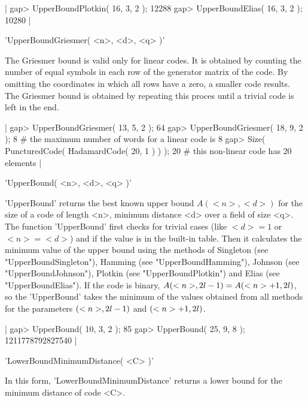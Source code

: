 |    gap> UpperBoundPlotkin( 16, 3, 2 );
    12288
    gap> UpperBoundElias( 16, 3, 2 );
    10280 |


'UpperBoundGriesmer( <n>, <d>, <q> )'

The Griesmer  bound is valid only   for linear codes.  It is  obtained by
counting the number of equal symbols in  each row of the generator matrix
of the code. By omitting the coordinates in which all rows have a zero, a
smaller code  results.  The Griesmer bound  is obtained by repeating this
proces until a trivial code is left in the end.

|    gap> UpperBoundGriesmer( 13, 5, 2 );
    64
    gap> UpperBoundGriesmer( 18, 9, 2 );
    8        # the maximum number of words for a linear code is 8
    gap> Size( PuncturedCode( HadamardCode( 20, 1 ) ) );
    20       # this non-linear code has 20 elements |


'UpperBound( <n>, <d>, <q> )'

'UpperBound' returns the best known upper bound $A(<n>,<d>)$ for the size
of a code of length <n>, minimum  distance <d> over a  field of size <q>.
The function 'UpperBound' first checks for trivial cases (like $<d>=1$ or
$<n>=<d>$) and if the value is in the  built-in table. Then it calculates
the minimum value of the upper bound using the  methods of Singleton (see
"UpperBoundSingleton"),  Hamming (see "UpperBoundHamming"), Johnson  (see
"UpperBoundJohnson"), Plotkin  (see  "UpperBoundPlotkin")  and Elias (see
"UpperBoundElias").  If the code is   binary, $A(<n>, 2\*l-1) =  A(<n>+1,
2\*l)$, so the 'UpperBound' takes the minimum of the values obtained from
all methods for the parameters $(<n>, 2\*l-1)$ and $(<n>+1, 2\*l)$.

|    gap> UpperBound( 10, 3, 2 );
    85
    gap> UpperBound( 25, 9, 8 );
    1211778792827540 |


'LowerBoundMinimumDistance( <C> )'

In this form, 'LowerBoundMinimumDistance'  returns a lower bound for  the
minimum distance of code <C>.

